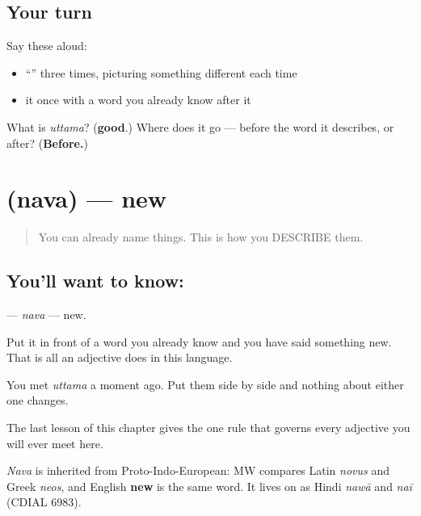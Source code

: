 \subsection*{Your turn}
Say these aloud:

\begin{itemize}
\raggedright
  \item \textquotedblleft{}\textquotedblright{} three times, picturing something different each time
  \item it once with a word you already know after it
\end{itemize}

\begin{tcolorbox}[breakable,colback=teal!4,colframe=teal!35!black,title={Before you move on}]
What is \emph{uttama}? (\textbf{good}.) Where does it go — before the word it describes, or after? (\textbf{Before.})
\end{tcolorbox}
\section[\texorpdfstring{\sk{नव} (nava)}{नव (nava)}]{ (nava) — new}

\label{lesson:SA-C15-new}



\begin{quote}
You can already name things. This is how you DESCRIBE them.
\end{quote}

\subsection*{You'll want to know: }
\textbf{} — \emph{nava} — new.

Put it in front of a word you already know and you have said something new. That is all an adjective does in this language.

You met \emph{uttama} a moment ago. Put them side by side and nothing about either one changes.

The last lesson of this chapter gives the one rule that governs every adjective you will ever meet here.

\begin{cousinweb}
\emph{Nava} is inherited from Proto-Indo-European: MW compares Latin \emph{novus} and Greek \emph{neos}, and English \textbf{new} is the same word. It lives on as Hindi \emph{nawā} and \emph{naī} (CDIAL 6983).
\end{cousinweb}

